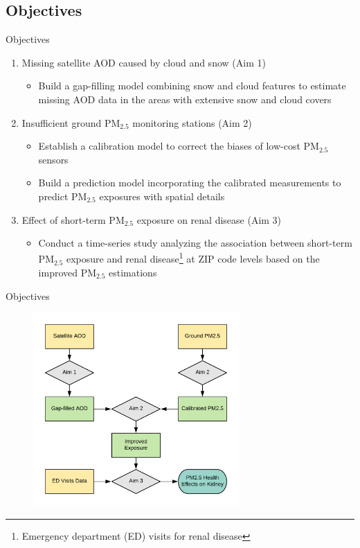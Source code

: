 \documentclass{beamer}
\begin{document}
\subsection{Objectives}
\begin{frame}{Objectives}
    \begin{enumerate}
        \item<1> Missing satellite AOD caused by cloud and snow (Aim 1)
            \begin{itemize}
                \item \textcolor[rgb]{0.1,0.1,0.6}{Build a gap-filling model combining snow and cloud features to estimate missing AOD data in the areas with extensive snow and cloud covers}
            \end{itemize}
        \item<2> Insufficient ground PM$_{2.5}$ monitoring stations (Aim 2)
            \begin{itemize}
                \item \textcolor[rgb]{0.1,0.1,0.6}{Establish a calibration model to correct the biases of low-cost PM$_{2.5}$ sensors}
                \item \textcolor[rgb]{0.1,0.1,0.6}{Build a prediction model incorporating the calibrated measurements to predict PM$_{2.5}$ exposures with spatial details}
            \end{itemize}
        \item<3> Effect of short-term PM$_{2.5}$ exposure on renal disease (Aim 3)
            \begin{itemize}
                \item \textcolor[rgb]{0.1,0.1,0.6}{Conduct a time-series study analyzing the association between short-term PM$_{2.5}$ exposure and renal disease\footnote{Emergency department (ED) visits for renal disease} at ZIP code levels based on the improved PM$_{2.5}$ estimations}
            \end{itemize}
    \end{enumerate}
\end{frame}

\begin{frame}{Objectives}
    \begin{figure}
        \centering
        \includegraphics[width=0.7\textwidth]{img/flow.png}
    \end{figure}
\end{frame}
\end{document}
